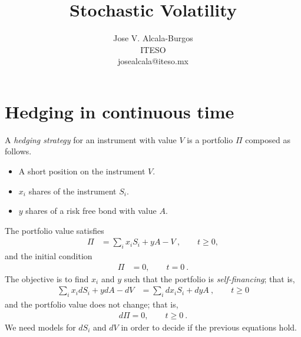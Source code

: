 \documentclass[10pt]{article}
\numberwithin{equation}{section}
\begin{document}
\title{Stochastic Volatility}
\author{Jose V. Alcala-Burgos \\
ITESO\\
josealcala@iteso.mx}

\maketitle

\begin{abstract}

\end{abstract}



\section{Hedging in continuous time}
A \emph{hedging strategy} for an instrument with value $V$ is a portfolio $\Pi$ composed as follows.
\begin{itemize}
\item A short position on the instrument $V$.
\item $x_i$ shares of the instrument $S_i$.
\item $y$ shares of a risk free bond with value $A$.
\end{itemize}
The portfolio value satisfies
\begin{equation}
	\begin{split}
	\Pi &= \sum_{i} x_i S_i + y A - V\:,\qquad t\geq0,
	\end{split}
\end{equation}
and the initial condition
\begin{equation*}
	\begin{split}
	\Pi &= 0,\qquad t=0\:.	
	\end{split}
\end{equation*}
The objective is to find $x_i$ and $y$ such that the portfolio is \emph{self-financing}; that is,
\begin{equation}\label{self}
	\begin{split}
	\sum_{i} x_i dS_i+y dA-dV&=\sum_{i} dx_i S_i +dy A\:,\qquad t\geq 0
	\end{split}
\end{equation}
and the portfolio value does not change; that is,
\begin{equation}\label{constant}
	\begin{split}
	d\Pi = 0,\qquad t\geq 0\:.
	\end{split}
\end{equation}
We need models for $dS_i$ and $dV$ in order to decide if the previous equations hold.
\end{document}
